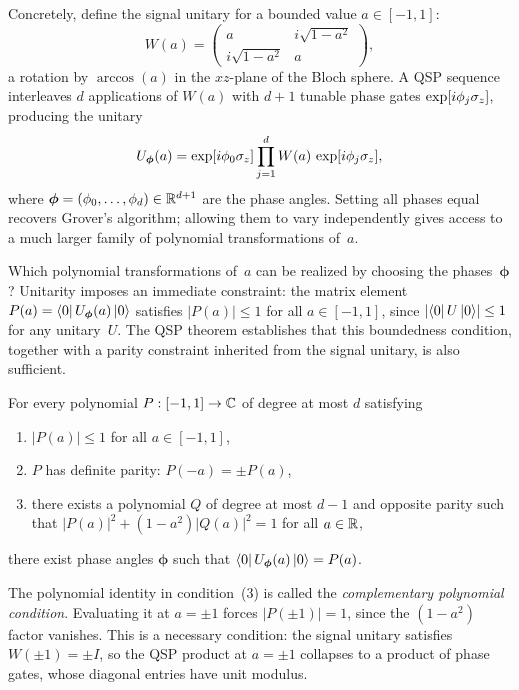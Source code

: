 Concretely, define the signal unitary for a bounded
value $a \in [-1,1]$:
\begin{equation}
	W(a) = \begin{pmatrix} a             & i\sqrt{1-a^2} \\
                i\sqrt{1-a^2} & a\end{pmatrix},
	\label{eq:standard-signal}
\end{equation}
a rotation by $\arccos(a)$ in the $xz$-plane of the
Bloch sphere.  A QSP sequence interleaves $d$
applications of $W(a)$ with $d+1$ tunable phase gates
$\exp[i\phi_j\sigma_z]$, producing the unitary
\begin{equation}
	U_{\bm{\phi}}(a)
	= \exp[i\phi_0\sigma_z]
	\prod_{j=1}^{d} W(a)\,\exp[i\phi_j\sigma_z],
	\label{eq:standard-qsp}
\end{equation}
where $\bm{\phi} = (\phi_0, \ldots, \phi_d) \in \mathbb{R}^{d+1}$
are the phase angles.  Setting all phases equal recovers
Grover's algorithm; allowing them to vary independently
gives access to a much larger family of polynomial
transformations of~$a$.

Which polynomial transformations of~$a$ can be realized
by choosing the phases~$\bm{\phi}$?  Unitarity imposes
an immediate constraint: the matrix element
$P(a) = \bra{0}U_{\bm{\phi}}(a)\ket{0}$ satisfies
$|P(a)| \leq 1$ for all $a \in [-1,1]$, since
$|\!\bra{0}U\ket{0}\!| \leq 1$ for any unitary~$U$.
The QSP theorem establishes that this boundedness
condition, together with a parity constraint inherited
from the signal unitary, is also sufficient.

\begin{theorem}
	\label{thm:standard-qsp}
	For every polynomial $P: [-1,1] \to \mathbb{C}$ of degree at
	most $d$ satisfying
	\begin{enumerate}
		\item $|P(a)| \leq 1$ for all $a \in [-1,1]$,
		\item $P$ has definite parity: $P(-a) = \pm P(a)$,
		\item there exists a polynomial $Q$ of degree at
		      most $d-1$ and opposite parity such that
		      $|P(a)|^2 + (1-a^2)|Q(a)|^2 = 1$ for all
		      $a \in \mathbb{R}$,
	\end{enumerate}
	there exist phase angles $\bm{\phi}$ such that
	$\bra{0}U_{\bm{\phi}}(a)\ket{0} = P(a)$.
\end{theorem}

The polynomial identity in condition~(3) is called the
\emph{complementary polynomial condition}.  Evaluating it
at $a = \pm 1$ forces $|P(\pm 1)| = 1$, since the
$(1-a^2)$ factor vanishes.  This is a necessary condition:
the signal unitary satisfies $W(\pm 1) = \pm I$, so the QSP
product at $a = \pm 1$ collapses to a product of phase gates,
whose diagonal entries have unit modulus.

